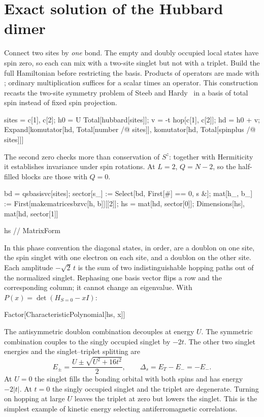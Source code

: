 \section{Exact solution of the Hubbard dimer}
Connect two sites by \emph{one} bond. The empty and doubly occupied
local states have spin zero, so each can mix with a two-site singlet
but not with a triplet. Build the full Hamiltonian before restricting
the basis. Products of operators are made with ; ordinary
multiplication suffices for a scalar times an operator.
This construction recasts the two-site symmetry problem of Steeb and
Hardy~\cite[Sec.~3.4, problem 84]{steeb} in a basis of total spin
instead of fixed spin projection.
\begin{wl}
sites = {c[1], c[2]};
h0 = U Total[hubbard[sites]];
v = -t hop[c[1], c[2]];
hd = h0 + v;
Expand[{komutator[hd, Total[number /@ sites]],
  komutator[hd, Total[spinplus /@ sites]]}]
\end{wl}
The second zero checks more than conservation of $S^z$: together with
Hermiticity it establishes invariance under spin rotations. At $L=2$,
$Q=N-2$, so the half-filled blocks are those with $Q=0$.
\begin{wl}
bd = qsbasisvc[sites];
sector[s_] := Select[bd, First[#] == {0, s} &];
mat[h_, b_] := First[makematricesbzvc[h, b]][[2]];
hs = mat[hd, sector[0]];
{Dimensions[hs], mat[hd, sector[1]]}
\end{wl}
\begin{wl}
hs // MatrixForm
\end{wl}
In this phase convention the diagonal states, in order, are a doublon
on one site, the spin singlet with one electron on each site, and a
doublon on the other site. Each amplitude $-\sqrt{2}\,t$ is the sum of
two indistinguishable hopping paths out of the normalized singlet.
Rephasing one basis vector flips a row and the corresponding column;
it cannot change an eigenvalue. With $P(x)=\det(H_{S=0}-xI)$:
\begin{wl}
Factor[CharacteristicPolynomial[hs, x]]
\end{wl}
The antisymmetric doublon combination decouples at energy $U$. The
symmetric combination couples to the singly occupied singlet by $-2t$.
The other two singlet energies and the singlet--triplet splitting are
\begin{equation}
 E_\pm=\frac{U\pm\sqrt{U^2+16t^2}}2,\qquad
 \Delta_s=E_T-E_-=-E_- .
 \label{eq:dimer}
\end{equation}
At $U=0$ the singlet fills the bonding orbital with both spins and has
energy $-2|t|$. At $t=0$ the singly occupied singlet and the triplet
are degenerate. Turning on hopping at large $U$ leaves the triplet at
zero but lowers the singlet. This is the simplest example of kinetic
energy selecting antiferromagnetic correlations.

